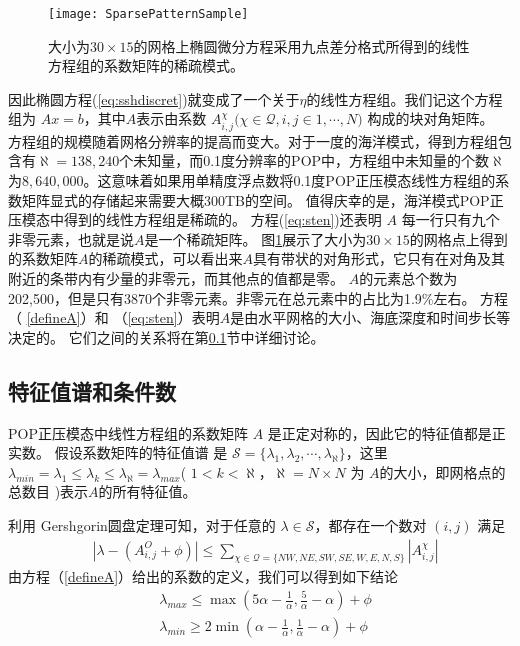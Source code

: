 \begin{figure}
\centering
\texttt{[image: SparsePatternSample]}
\caption[] {大小为$30\times 15$的网格上椭圆微分方程采用九点差分格式所得到的线性方程组的系数矩阵的稀疏模式。 \label{fig:spy}}
\end{figure}
因此椭圆方程(\ref{eq:sshdiscret})就变成了一个关于$\eta$的线性方程组。我们记这个方程组为 $Ax= b$，其中$A$表示由系数 $A_{i,j}^{\chi } ( \chi \in \mathcal{Q}, i,j \in {1,\cdots, N)}$ 构成的块对角矩阵。
方程组的规模随着网格分辨率的提高而变大。对于一度的海洋模式，得到方程组包含有$\aleph = 138,240$个未知量，而0.1度分辨率的POP中，方程组中未知量的个数$\aleph$ 为$8,640,000$。这意味着如果用单精度浮点数将0.1度POP正压模态线性方程组的系数矩阵显式的存储起来需要大概300TB的空间。
值得庆幸的是，海洋模式POP正压模态中得到的线性方程组是稀疏的。
方程(\ref{eq:sten})还表明 $A$ 每一行只有九个非零元素，也就是说$A$是一个稀疏矩阵。 图\ref{fig:spy}展示了大小为$30\times 15$的网格点上得到的系数矩阵$A$的稀疏模式，可以看出来$A$具有带状的对角形式，它只有在对角及其附近的条带内有少量的非零元，而其他点的值都是零。
$A$的元素总个数为202,500，但是只有3870个非零元素。非零元在总元素中的占比为1.9\%左右。
方程（ \ref{defineA}）和 （\ref{eq:sten}）表明$A$是由水平网格的大小、海底深度和时间步长等决定的。
它们之间的关系将在第\ref{solver:Algorithm:condition}节中详细讨论。

\subsection{特征值谱和条件数}
\label{solver:Algorithm:condition}

POP正压模态中线性方程组的系数矩阵 $A$ 是正定对称的\cite{smith2010parallel}，因此它的特征值都是正实数\cite{stewart1976positive}。
假设系数矩阵的特征值谱\cite{golub2012matrix} 是 $\mathcal{S} = \{\lambda_1, \lambda_2, \cdots, \lambda_\aleph\}$，这里 $\lambda_{min} = \lambda_1 \le \lambda_k \le \lambda_\aleph = \lambda_{max}$( $1<k <\aleph $，$\aleph=N\times N$ 为 $A$的大小，即网格点的总数目 )表示$A$的所有特征值。

利用 Gershgorin圆盘定理\cite{bell1965gershgorin}可知，对于任意的 $\lambda \in \mathcal{S}$，都存在一个数对 $(i,j)$ 满足
\begin{align}
&|\lambda -  (A_{i,j}^O + \phi ) | \le \sum_{\chi \in \mathcal{Q} = \{NW,NE,SW,SE,W,E,N,S\}}|A_{i,j}^\chi|
\end{align}
由方程（\ref{defineA}）给出的系数的定义，我们可以得到如下结论 
\begin{align} \label{eigsGersh}
&\lambda_{max} \le  \max (  5\alpha - \frac{1}{\alpha}, \frac{5}{\alpha}- \alpha) +\phi   \\
&\lambda_{min} \ge 2\min (  \alpha - \frac{1}{\alpha},\frac{1} {\alpha} -  \alpha) + \phi
\end{align}

